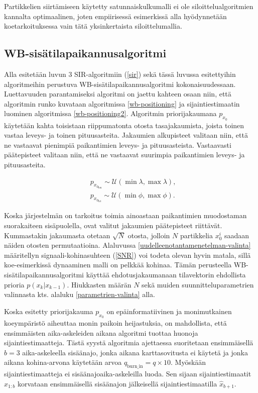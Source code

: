 \documentclass[
  12pt,
  a4paper, twoside]{book}
\begin{document}
Partikkelien siirtämiseen käytetty satunnaiskulkumalli ei ole siloittelualgoritmien kannalta optimaalinen, joten empiirisessä esimerkissä alla hyödynnetään koetarkoituksessa vain tätä yksinkertaista siloittelumallia.

\subsection{WB-sisätilapaikannusalgoritmi}

Alla esitetään luvun 3 SIR-algoritmiin (\ref{sir}) sekä tässä luvussa esitettyihin algoritmeihin perustuva WB-sisätilapaikannusalgoritmi kokonaisuudessaan. Luettavuuden parantamiseksi algoritmi on jaettu kahteen osaan niin, että algoritmin runko kuvataan algoritmissa \ref{wb-positioning} ja sijaintiestimaatin luominen algoritmissa \ref{wb-positioning2}. Algoritmin priorijakaumana \(p_{x_0}\) käytetään kahta toisistaan riippumatonta otosta tasajakaumista, joista toinen vastaa leveys- ja toinen pituusasteita. Jakaumien alkupisteet valitaan niin, että ne vastaavat pienimpiä paikantimien leveys- ja pituusasteista. Vastaavasti päätepisteet valitaan niin, että ne vastaavat suurimpia paikantimien leveys- ja pituusasteita.

\begin{align} \label{priorijakauma}
&p_{x_{0_{\text{lon}}}}\sim\mathcal{U}(\min{\lambda},\max{\lambda}),\\
&p_{x_{0_{\text{lat}}}}\sim\mathcal{U}(\min{\phi},\max{\phi}).
\end{align}

\noindent Koska järjestelmän on tarkoitus toimia ainoastaan paikantimien muodostaman suorakaiteen sisäpuolella, ovat valitut jakaumien päätepisteet riittävät. Kummastakin jakaumasta otetaan \(\sqrt{N}\) otosta, jolloin \(N\) partikkelia \(x^i_0\) saadaan näiden otosten permutaatioina. Alaluvussa \ref{uudelleenotantamenetelman-valinta} määritellyn signaali-kohinasuhteen (\ref{SNR}) voi todeta olevan hyvin matala, sillä koe-esimerkissä dynaaminen malli on pelkkää kohinaa. Tämän perusteella WB-sisätilapaikannusalgoritmi käyttää ehdotusjakaumanaan tilavektorin ehdollista prioria \(p(x_k|x_{k-1})\). Hiukkasten määrän \(N\) sekä muiden suunnitteluparametrien valinnasta kts. alaluku \ref{parametrien-valinta} alla.

Koska esitetty priorijakauma \(p_{x_0}\) on epäinformatiivinen ja monimutkainen koeympäristö aiheuttaa monin paikoin heijastuksia, on mahdollista, että ensimmäisten aika-askeleiden aikana algoritmi tuottaa huonoja sijaintiestimaatteja. Tästä syystä algoritmia ajettaessa suoritetaan ensimmäisellä \(b=3\) aika-askeleella sisäänajo, jonka aikana karttasovitusta ei käytetä ja jonka aikana kohina-arvona käytetään arvoa \(q_{\text{burn\_in}}=q\times10\). Myöskään sijaintiestimaatteja ei sisäänajoaika-askeleilla luoda. Sen sijaan sijaintiestimaatit \(\hat{x}_{1:b}\) korvataan ensimmäisellä sisäänajon jälkeisellä sijaintiestimaatilla \(\hat{x}_{b+1}\).
\end{document}
